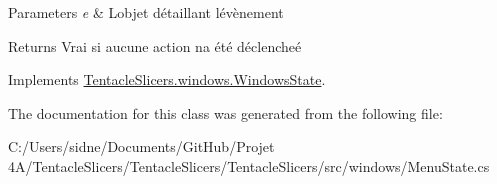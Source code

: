 \begin{DoxyParams}{Parameters}
{\em e} & L\textquotesingle{}objet détaillant l\textquotesingle{}évènement \\
\hline
\end{DoxyParams}
\begin{DoxyReturn}{Returns}
Vrai si aucune action n\textquotesingle{}a été déclencheé 
\end{DoxyReturn}


Implements \hyperlink{class_tentacle_slicers_1_1windows_1_1_windows_state}{Tentacle\+Slicers.\+windows.\+Windows\+State}.



The documentation for this class was generated from the following file\+:\begin{DoxyCompactItemize}
\item 
C\+:/\+Users/sidne/\+Documents/\+Git\+Hub/\+Projet 4\+A/\+Tentacle\+Slicers/\+Tentacle\+Slicers/\+Tentacle\+Slicers/src/windows/Menu\+State.\+cs\end{DoxyCompactItemize}
